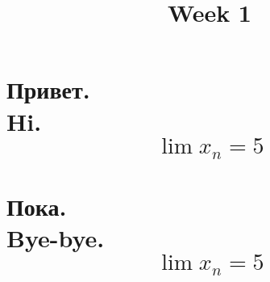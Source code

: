 \documentclass[]{article}
\title{Week 1}
\author{}
\begin{document}
	
	\maketitle
	
	\section{
		Привет.\\
		Hi.
		$$ \lim x_n = 5 $$
	}
	
	\section{
		Пока. \\
		Bye-bye.
		$$ \lim x_n = 5 $$
	}
	
\end{document}
